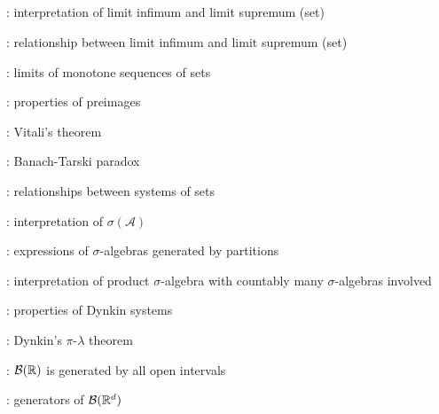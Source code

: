 \subsection*{}
\item {}: interpretation of limit infimum and limit supremum (set)
\item {}: relationship between limit infimum and limit supremum (set)
\item {}: limits of monotone sequences of sets
\item {}: properties of preimages
\item {}: Vitali's theorem
\item {}: Banach-Tarski paradox
\item {}: relationships between systems of sets
\item {}: interpretation of \(\sigma(\mathcal{A})\)
\item {}: expressions of \(\sigma\)-algebras generated by partitions
\item {}: interpretation of product
\(\sigma\)-algebra with countably many \(\sigma\)-algebras involved
\item {}: properties of Dynkin systems
\item {}: Dynkin's \(\pi\)-\(\lambda\) theorem
\item {}: \(\mathcal{B}(\mathbb{R})\) is generated by all open intervals
\item {}: generators of \(\mathcal{B}(\mathbb{R}^d)\)
